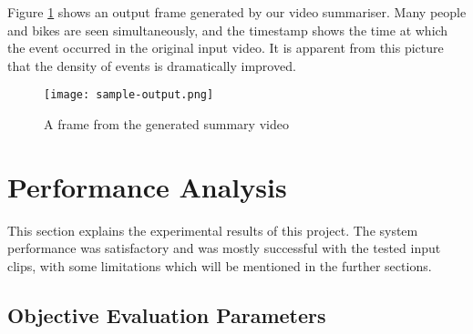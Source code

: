 Figure \ref{img:sample-output} shows an output frame generated by our video
summariser. Many people and bikes are seen simultaneously, and the timestamp
shows the time at which the event occurred in the original input video. It is
apparent from this picture that the density of events is dramatically
improved.

\begin{figure}[H]
    \centering
    \texttt{[image: sample-output.png]}
    \caption{A frame from the generated summary video}
    \label{img:sample-output}
\end{figure}


\section{Performance Analysis}

This section explains the experimental results of this project. The system
performance was satisfactory and was mostly successful with the tested input
clips, with some limitations which will be mentioned in the further sections.

    \subsection{Objective Evaluation Parameters}

